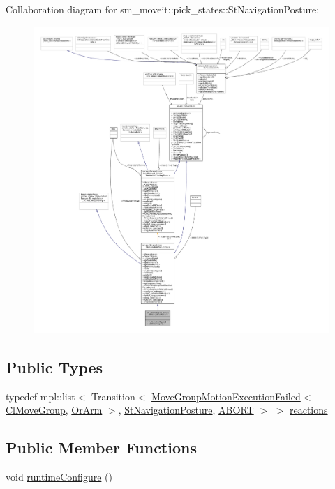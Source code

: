 Collaboration diagram for sm\+\_\+moveit\+:\+:pick\+\_\+states\+:\+:St\+Navigation\+Posture\+:
\nopagebreak
\begin{figure}[H]
\begin{center}
\leavevmode
\includegraphics[width=350pt]{structsm__moveit_1_1pick__states_1_1StNavigationPosture__coll__graph}
\end{center}
\end{figure}
\subsection*{Public Types}
\begin{DoxyCompactItemize}
\item 
typedef mpl\+::list$<$ Transition$<$ \hyperlink{structmoveit__z__client_1_1MoveGroupMotionExecutionFailed}{Move\+Group\+Motion\+Execution\+Failed}$<$ \hyperlink{classmoveit__z__client_1_1ClMoveGroup}{Cl\+Move\+Group}, \hyperlink{classsm__moveit_1_1OrArm}{Or\+Arm} $>$, \hyperlink{structsm__moveit_1_1pick__states_1_1StNavigationPosture}{St\+Navigation\+Posture}, \hyperlink{classABORT}{A\+B\+O\+RT} $>$ $>$ \hyperlink{structsm__moveit_1_1pick__states_1_1StNavigationPosture_a4a54be576d30bc2cb4055730f0fad0c6}{reactions}
\end{DoxyCompactItemize}
\subsection*{Public Member Functions}
\begin{DoxyCompactItemize}
\item 
void \hyperlink{structsm__moveit_1_1pick__states_1_1StNavigationPosture_add5f3d828cb52f6320e5d60fbbf7dec6}{runtime\+Configure} ()
\end{DoxyCompactItemize}

